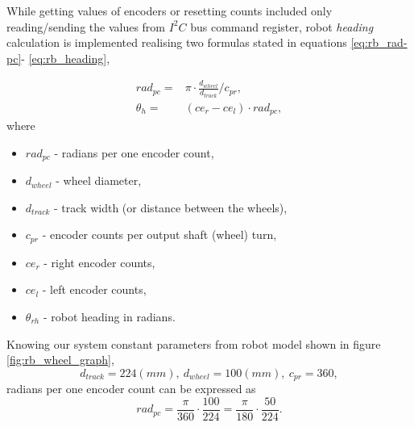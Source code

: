 While getting values of encoders or resetting counts included only reading/sending the values from  $I^2C$ bus command register, robot \textit{heading} calculation is implemented realising two formulas stated in equations \ref{eq:rb_rad-pc}- \ref{eq:rb_heading},

\begin{eqnarray}
rad_{pc}  = & \pi \cdot \frac{ d_{wheel} }{ d_{track} } / c_{pr}	,
\label{eq:rb_rad-pc}
\\
\theta_{h} = & (ce_{r} - ce_{l} ) \cdot rad_{pc} ,
\label{eq:rb_heading}
\end{eqnarray}
where 
\begin{itemize}
	\item $rad_{pc}$ - radians per one encoder count,
	\item $d_{wheel}$ - wheel diameter,
	\item $d_{track}$ - track width (or distance between the wheels), %
	\item $c_{pr}$ - encoder counts per output shaft (wheel) turn,
	\item $ce_{r}$ - right encoder counts,
	\item $ce_{l}$ - left encoder counts,
	\item $\theta_{rh}$ - robot heading in radians.
\end{itemize}

Knowing our system constant parameters from robot model shown in figure \ref{fig:rb_wheel_graph},
$$
d_{track} = 224 (mm), \ d_{wheel}=100 (mm), \ c_{pr}=360,
$$
radians per one encoder count can be expressed as
$$
rad_{pc}  = \frac{\pi}{360}\cdot \frac{ 100 }{ 224 } = \frac{\pi}{180}\cdot \frac{ 50 }{ 224 }.
$$

